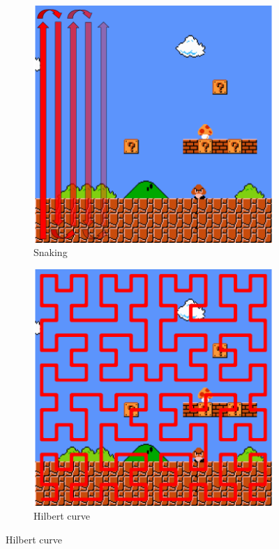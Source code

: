\documentclass[a4paper]{article}
\begin{document}
\begin{figure}[ht]
\begin{subfigure}[t]{0.18\textwidth}
    \label{fig:vertical}
    \end{subfigure}
    \begin{subfigure}[t]{0.18\textwidth}
    \includegraphics[width=1\textwidth]{figures/Snaking__1_.png} 	       \caption{Snaking}
    \label{fig:snaking}
    \end{subfigure}
    \begin{subfigure}[t]{0.18\textwidth}
    \includegraphics[width=1\textwidth]{figures/Hilbert.png}	       \caption{Hilbert curve}

\end{subfigure}
\end{figure}
\end{document}
